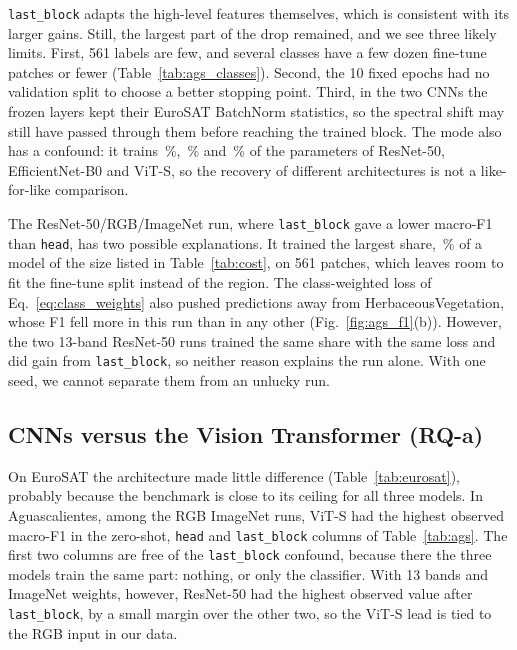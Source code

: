 \texttt{last\_block} adapts the high-level features themselves, which is consistent with its
larger gains. Still, the largest part of the drop remained, and we see three likely limits.
First, 561 labels are few, and several classes have a few dozen fine-tune patches or fewer
(Table~\ref{tab:ags_classes}). Second, the 10 fixed epochs had no validation split to choose a
better stopping point. Third, in the two CNNs the frozen layers kept their EuroSAT
BatchNorm statistics, so the spectral shift may still have passed through them before reaching
the trained block. The mode
also has a confound: it trains \LastBlockShareResNet\,\%, \LastBlockShareEffNet\,\% and
\LastBlockShareViT\,\% of the parameters of ResNet-50, EfficientNet-B0 and ViT-S, so the
recovery of different architectures is not a like-for-like comparison.

The ResNet-50/RGB/ImageNet run, where \texttt{last\_block} gave a lower macro-F1 than
\texttt{head}, has two possible explanations. It trained the largest share,
\LastBlockShareResNet\,\% of a model of the size listed in Table~\ref{tab:cost}, on 561 patches,
which leaves room to fit the fine-tune split instead of the region. The class-weighted loss of
Eq.~\eqref{eq:class_weights} also pushed predictions away from HerbaceousVegetation, whose F1 fell
more in this run than in any other (Fig.~\ref{fig:ags_f1}(b)). However, the two 13-band
ResNet-50 runs trained the same share with the same loss and did gain from \texttt{last\_block},
so neither reason explains the run alone. With one seed, we cannot separate them from an unlucky
run.

\subsection{CNNs versus the Vision Transformer (RQ-a)}

On EuroSAT the architecture made little difference (Table~\ref{tab:eurosat}), probably because
the benchmark is close to its ceiling for all three models. In Aguascalientes, among the RGB
ImageNet runs, ViT-S had the highest observed macro-F1 in the zero-shot, \texttt{head} and
\texttt{last\_block} columns of Table~\ref{tab:ags}. The first two columns are free of the
\texttt{last\_block} confound, because there the three models train the same part: nothing, or
only the classifier. With 13 bands and ImageNet weights, however, ResNet-50 had the highest
observed value after \texttt{last\_block}, by a small margin over the other two, so the ViT-S
lead is tied to the RGB input in our data.

